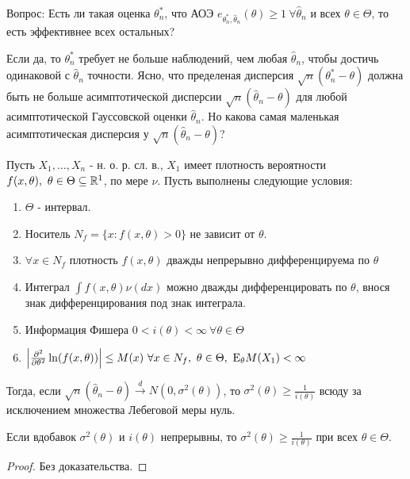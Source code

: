 Вопрос: Есть ли такая оценка \(\theta^*_n\), что АОЭ \(e_{\theta^*_n, \widehat{\theta}_n}(\theta) \geq 1 \ \forall \widehat{\theta}_n\)
и всех \(\theta \in \Theta\), то есть эффективнее всех остальных?

Если да, то \(\theta^*_n\) требует не больше наблюдений, чем любая \(\widehat{\theta}_n\), чтобы достичь одинаковой с \(\widehat{\theta}_n\) точности.
Ясно, что пределеная дисперсия \(\sqrt{n}(\theta^*_n - \theta)\) должна быть не больше асимптотической дисперсии
\(\sqrt{n}(\widehat{\theta}_n - \theta)\) для любой асимптотической Гауссовской оценки \(\widehat{\theta}_n\). Но
какова самая маленькая асимптотическая дисперсия у \(\sqrt{n}(\widehat{\theta}_n - \theta)\)?

\newpage
\begin{theorem*}
Пусть \(X_1, \ldots, X_n\) - н. о. р. сл. в., \(X_1\) имеет
плотность вероятности \(f(x, \theta),\ \theta \in \Theta \subseteq \R^1\),
по мере \(\nu\). Пусть выполнены следующие условия:
\begin{enumerate}
    \item \(\Theta\) - интервал.
    \item Носитель \(N_f = \{x: f(x, \theta) > 0\}\) не зависит от \(\theta\).
    \item \label{th::bahadur:density} \(\forall x \in N_f\) плотность \(f(x, \theta)\) дважды непрерывно
        дифференцируема по \(\theta\)
    \item \label{th::bahadur:integral} Интеграл \(\int f(x, \theta)\nu(dx)\)  можно
        дважды дифференцировать по \(\theta\), внося знак
        дифференцирования под знак интеграла.
    \item Информация Фишера \(0 < i(\theta) < \infty \ \forall \theta \in \Theta\)
    \item \label{th::bahadur:second_partial} \(\left\lvert \frac{\partial^2}{\partial \theta^2} \ln(f(x, \theta)) \right\rvert  \leq M(x) \ \forall x \in N_f, \ \theta \in \Theta, \ \mathrm{E}_\theta M(X_1) < \infty\)
\end{enumerate}
Тогда, если \(\sqrt{n}(\widehat{\theta}_n - \theta) \xrightarrow{d} N(0, \sigma^2(\theta))\),
то \(\sigma^2(\theta) \geq \frac{1}{i(\theta)}\) всюду за исключением
множества Лебеговой меры нуль.
\end{theorem*}
\begin{remark}
    Если вдобавок \(\sigma^2(\theta)\) и \(i(\theta)\) непрерывны,
    то \(\sigma^2(\theta) \geq \frac{1}{i(\theta)}\) при всех \(\theta \in \Theta\).
\end{remark}
\begin{proof}
    Без доказательства.
\end{proof}

